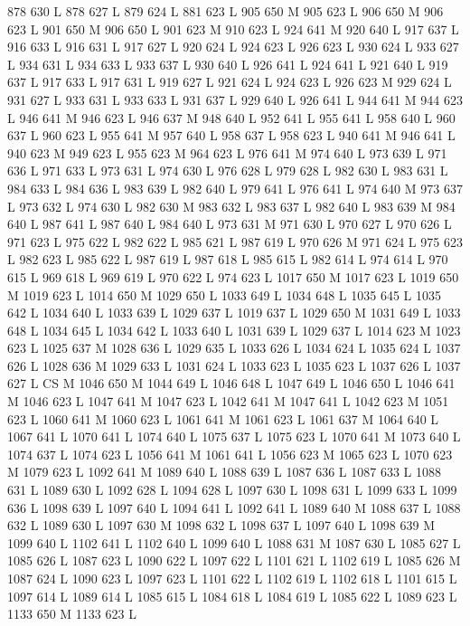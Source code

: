 {{{{{{{{{{{{{{{{{{{{{{{{{{{{{{878 630 L
878 627 L
879 624 L
881 623 L
905 650 M 905 623 L
906 650 M 906 623 L
901 650 M 906 650 L
901 623 M 910 623 L
924 641 M 920 640 L
917 637 L
916 633 L
916 631 L
917 627 L
920 624 L
924 623 L
926 623 L
930 624 L
933 627 L
934 631 L
934 633 L
933 637 L
930 640 L
926 641 L
924 641 L
921 640 L
919 637 L
917 633 L
917 631 L
919 627 L
921 624 L
924 623 L
926 623 M 929 624 L
931 627 L
933 631 L
933 633 L
931 637 L
929 640 L
926 641 L
944 641 M 944 623 L
946 641 M 946 623 L
946 637 M 948 640 L
952 641 L
955 641 L
958 640 L
960 637 L
960 623 L
955 641 M 957 640 L
958 637 L
958 623 L
940 641 M 946 641 L
940 623 M 949 623 L
955 623 M 964 623 L
976 641 M 974 640 L
973 639 L
971 636 L
971 633 L
973 631 L
974 630 L
976 628 L
979 628 L
982 630 L
983 631 L
984 633 L
984 636 L
983 639 L
982 640 L
979 641 L
976 641 L
974 640 M 973 637 L
973 632 L
974 630 L
982 630 M 983 632 L
983 637 L
982 640 L
983 639 M 984 640 L
987 641 L
987 640 L
984 640 L
973 631 M 971 630 L
970 627 L
970 626 L
971 623 L
975 622 L
982 622 L
985 621 L
987 619 L
970 626 M 971 624 L
975 623 L
982 623 L
985 622 L
987 619 L
987 618 L
985 615 L
982 614 L
974 614 L
970 615 L
969 618 L
969 619 L
970 622 L
974 623 L
1017 650 M 1017 623 L
1019 650 M 1019 623 L
1014 650 M 1029 650 L
1033 649 L
1034 648 L
1035 645 L
1035 642 L
1034 640 L
1033 639 L
1029 637 L
1019 637 L
1029 650 M 1031 649 L
1033 648 L
1034 645 L
1034 642 L
1033 640 L
1031 639 L
1029 637 L
1014 623 M 1023 623 L
1025 637 M 1028 636 L
1029 635 L
1033 626 L
1034 624 L
1035 624 L
1037 626 L
1028 636 M 1029 633 L
1031 624 L
1033 623 L
1035 623 L
1037 626 L
1037 627 L
CS M
1046 650 M 1044 649 L
1046 648 L
1047 649 L
1046 650 L
1046 641 M 1046 623 L
1047 641 M 1047 623 L
1042 641 M 1047 641 L
1042 623 M 1051 623 L
1060 641 M 1060 623 L
1061 641 M 1061 623 L
1061 637 M 1064 640 L
1067 641 L
1070 641 L
1074 640 L
1075 637 L
1075 623 L
1070 641 M 1073 640 L
1074 637 L
1074 623 L
1056 641 M 1061 641 L
1056 623 M 1065 623 L
1070 623 M 1079 623 L
1092 641 M 1089 640 L
1088 639 L
1087 636 L
1087 633 L
1088 631 L
1089 630 L
1092 628 L
1094 628 L
1097 630 L
1098 631 L
1099 633 L
1099 636 L
1098 639 L
1097 640 L
1094 641 L
1092 641 L
1089 640 M 1088 637 L
1088 632 L
1089 630 L
1097 630 M 1098 632 L
1098 637 L
1097 640 L
1098 639 M 1099 640 L
1102 641 L
1102 640 L
1099 640 L
1088 631 M 1087 630 L
1085 627 L
1085 626 L
1087 623 L
1090 622 L
1097 622 L
1101 621 L
1102 619 L
1085 626 M 1087 624 L
1090 623 L
1097 623 L
1101 622 L
1102 619 L
1102 618 L
1101 615 L
1097 614 L
1089 614 L
1085 615 L
1084 618 L
1084 619 L
1085 622 L
1089 623 L
1133 650 M 1133 623 L
}}}}}}}}}}}}}}}}}}}}}}}}}}}}}}
